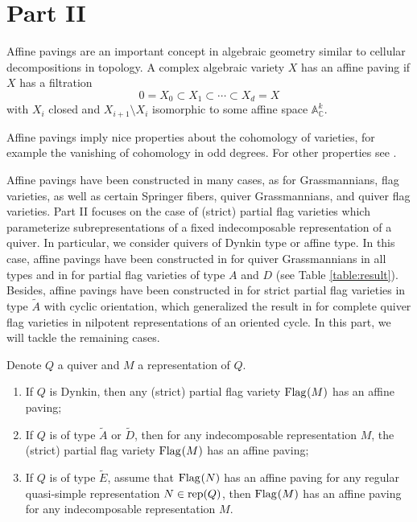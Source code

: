 \section*{Part II}

Affine pavings are an important concept in algebraic geometry similar to cellular decompositions in topology. A complex algebraic variety $X$ has an affine paving if $X$ has a filtration
$$0= X_0 \subset X_1 \subset \cdots \subset X_d=X$$
with $X_i$ closed and $X_{i+1} \setminus X_i$ isomorphic to some affine space $\mathbb{A}^k_{\mathbb{C}}$.

Affine pavings imply nice properties about the cohomology of varieties, for example the vanishing of cohomology in odd degrees. For other properties see \cite[1.7]{de1988homology}.

Affine pavings have been constructed in many cases, as for Grassmannians, flag varieties, as well as certain Springer fibers, quiver Grassmannians, and quiver flag varieties. Part II focuses on the case of (strict) partial flag varieties which parameterize subrepresentations of a fixed indecomposable representation of a quiver. In particular, we consider quivers of Dynkin type or affine type.
In this case, affine pavings have been constructed in \cite{irelli2019cell} for quiver Grassmannians in all types and in \cite{maksimau2019flag} for partial flag varieties of type $A$ and $D$ (see Table \ref{table:result}). Besides, affine pavings 
have been constructed in \cite[Theorem 6.3]{eberhardt2022motivic} for strict partial flag varieties in type $\tilde{A}$ with cyclic orientation, which generalized the result in \cite{sauter2015cell} for complete quiver flag varieties in nilpotent representations of an oriented cycle. In this part, we will tackle the remaining cases.
\begin{theoremB}\label{thm:affine_paving}
Denote $Q$ a quiver and $M$ a representation of $Q$.
\begingroup
{}
\upshape
\begin{enumerate}[(1)]
\item If $Q$ is Dynkin, then any (strict) partial flag variety $\operatorname{Flag}_{}(M)$ has an affine paving;
\item If $Q$ is of type $\tilde{A}$ or $\tilde{D}$, then for any indecomposable representation $M$, the (strict) partial flag variety $\operatorname{Flag}_{}(M)$ has an affine paving;
\item If $Q$ is of type $\tilde{E}$, assume that $\operatorname{Flag}_{}(N)$ has an affine paving for any regular quasi-simple representation $N \in \operatorname{\operatorname{rep}}(Q)$, then $\operatorname{Flag}_{}(M)$ has an affine paving for any indecomposable representation $M$.
\end{enumerate}
\endgroup
\end{theoremB}

